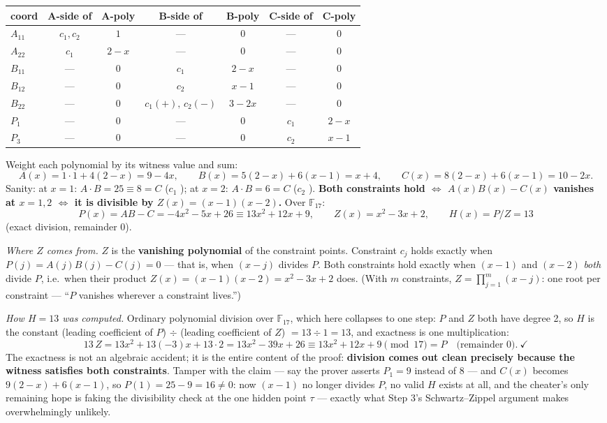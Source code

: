\documentclass[10pt]{article}
\begin{document}
\begin{center}
\begin{tabular}{lcccccc}
\toprule
coord & A-side of & A-poly & B-side of & B-poly & C-side of & C-poly\\
\midrule
$A_{11}$ & $c_1,c_2$ & $1$ & --- & 0 & --- & 0\\
$A_{22}$ & $c_1$ & $2-x$ & --- & 0 & --- & 0\\
$B_{11}$ & --- & 0 & $c_1$ & $2-x$ & --- & 0\\
$B_{12}$ & --- & 0 & $c_2$ & $x-1$ & --- & 0\\
$B_{22}$ & --- & 0 & $c_1 (+),\, c_2 (-)$ & $3-2x$ & --- & 0\\
$P_1$ & --- & 0 & --- & 0 & $c_1$ & $2-x$\\
$P_3$ & --- & 0 & --- & 0 & $c_2$ & $x-1$\\
\bottomrule
\end{tabular}
\end{center}

Weight each polynomial by its witness value and sum:
\[
A(x) = 1\cdot1 + 4(2-x) = 9 - 4x, \qquad
B(x) = 5(2-x) + 6(x-1) = x + 4, \qquad
C(x) = 8(2-x) + 6(x-1) = 10 - 2x.
\]
Sanity: at $x{=}1$: $A\!\cdot\!B = 25 \equiv 8 = C$ ($c_1$
\checkmark); at $x{=}2$: $A\!\cdot\!B = 6 = C$ ($c_2$ \checkmark).
\textbf{Both constraints hold $\iff$ $A(x)B(x) - C(x)$ vanishes at
$x = 1, 2$ $\iff$ it is divisible by $Z(x) = (x-1)(x-2)$.} Over
$\mathbb{F}_{17}$:
\[
P(x) = A B - C = -4x^2 - 5x + 26 \equiv 13x^2 + 12x + 9,
\qquad Z(x) = x^2 - 3x + 2,
\qquad H(x) = P/Z = 13
\]
(exact division, remainder 0).

\emph{Where $Z$ comes from.} $Z$ is the \textbf{vanishing
polynomial} of the constraint points. Constraint $c_j$ holds exactly
when $P(j) = A(j)B(j) - C(j) = 0$ --- that is, when $(x-j)$ divides
$P$. Both constraints hold exactly when $(x-1)$ and $(x-2)$
\emph{both} divide $P$, i.e.\ when their product
$Z(x) = (x-1)(x-2) = x^2 - 3x + 2$ does. (With $m$ constraints,
$Z = \prod_{j=1}^{m}(x-j)$: one root per constraint --- ``$P$
vanishes wherever a constraint lives.'')

\emph{How $H = 13$ was computed.} Ordinary polynomial division over
$\mathbb{F}_{17}$, which here collapses to one step: $P$ and $Z$
both have degree 2, so $H$ is the constant (leading coefficient of
$P$) $\div$ (leading coefficient of $Z$) $= 13 \div 1 = 13$, and
exactness is one multiplication:
\[
13\,Z = 13x^2 + 13(-3)x + 13\cdot 2 = 13x^2 - 39x + 26
      \equiv 13x^2 + 12x + 9 \pmod{17} = P
\quad\text{(remainder 0).}\ \checkmark
\]
The exactness is not an algebraic accident; it is the entire content
of the proof: \textbf{division comes out clean precisely because
the witness satisfies both constraints}. Tamper with the claim ---
say the prover asserts $P_1 = 9$ instead of 8 --- and $C(x)$ becomes
$9(2-x) + 6(x-1)$, so $P(1) = 25 - 9 = 16 \ne 0$: now $(x-1)$ no
longer divides $P$, no valid $H$ exists at all, and the cheater's
only remaining hope is faking the divisibility check at the one
hidden point $\tau$ --- exactly what Step 3's Schwartz--Zippel
argument makes overwhelmingly unlikely.
\end{document}
